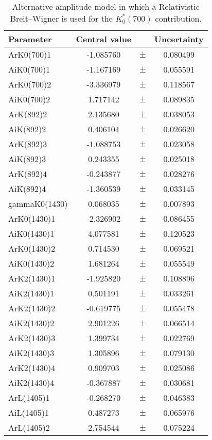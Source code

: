 \begin{table}
\centering
\caption{Alternative amplitude model in which a Relativistic Breit--Wigner is used for the $K^*_0(700)$ contribution.}
\begin{tiny}
\begin{tabular}{lccc}
\toprule
Parameter & Central value & & Uncertainty\\
\midrule
ArK0(700)1 & -1.085760 & $\pm$ & 0.080499 \\
AiK0(700)1 & -1.167169 & $\pm$ & 0.055591 \\
ArK0(700)2 & -3.336979 & $\pm$ & 0.118567 \\
AiK0(700)2 & 1.717142 & $\pm$ & 0.089835 \\
ArK(892)2 & 2.135680 & $\pm$ & 0.038053 \\
AiK(892)2 & 0.406104 & $\pm$ & 0.026620 \\
ArK(892)3 & -1.088753 & $\pm$ & 0.023058 \\
AiK(892)3 & 0.243355 & $\pm$ & 0.025018 \\
ArK(892)4 & -0.243877 & $\pm$ & 0.028276 \\
AiK(892)4 & -1.360539 & $\pm$ & 0.033145 \\
gammaK0(1430) & 0.068035 & $\pm$ & 0.007893 \\
ArK0(1430)1 & -2.326902 & $\pm$ & 0.086455 \\
AiK0(1430)1 & 4.077581 & $\pm$ & 0.120523 \\
ArK0(1430)2 & 0.714530 & $\pm$ & 0.069521 \\
AiK0(1430)2 & 1.681264 & $\pm$ & 0.055549 \\
ArK2(1430)1 & -1.925820 & $\pm$ & 0.108896 \\
AiK2(1430)1 & 0.501191 & $\pm$ & 0.033261 \\
ArK2(1430)2 & -0.619775 & $\pm$ & 0.055478 \\
AiK2(1430)2 & 2.901226 & $\pm$ & 0.066514 \\
ArK2(1430)3 & 1.399734 & $\pm$ & 0.022769 \\
AiK2(1430)3 & 1.305896 & $\pm$ & 0.079130 \\
ArK2(1430)4 & 0.909703 & $\pm$ & 0.025086 \\
AiK2(1430)4 & -0.367887 & $\pm$ & 0.030681 \\
ArL(1405)1 & -0.268270 & $\pm$ & 0.046383 \\
AiL(1405)1 & 0.487273 & $\pm$ & 0.065976 \\
ArL(1405)2 & 2.754544 & $\pm$ & 0.075224 \\

\end{tabular}
\end{tiny}
\end{table}
